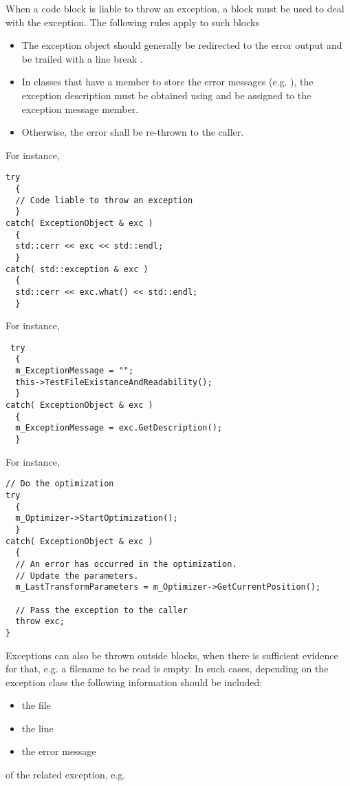 When a code block is liable to throw an exception, a  block must
be used to deal with the exception. The following rules apply to such blocks
\begin{itemize}
\item The exception object should generally be redirected to the error output
 and be trailed with a line break .
\item In classes that have a member to store the error messages (e.g.
), the exception description must be obtained using
 and be assigned to the exception message member.
\item Otherwise, the error shall be re-thrown to the caller.
\end{itemize}

For instance,

\small
\begin{verbatim}
try
  {
  // Code liable to throw an exception
  }
catch( ExceptionObject & exc )
  {
  std::cerr << exc << std::endl;
  }
catch( std::exception & exc )
  {
  std::cerr << exc.what() << std::endl;
  }
\end{verbatim}
\normalsize

For instance,

\small
\begin{verbatim}
 try
  {
  m_ExceptionMessage = "";
  this->TestFileExistanceAndReadability();
  }
catch( ExceptionObject & exc )
  {
  m_ExceptionMessage = exc.GetDescription();
  }
\end{verbatim}
\normalsize

For instance,

\small
\begin{verbatim}
// Do the optimization
try
  {
  m_Optimizer->StartOptimization();
  }
catch( ExceptionObject & exc )
  {
  // An error has occurred in the optimization.
  // Update the parameters.
  m_LastTransformParameters = m_Optimizer->GetCurrentPosition();

  // Pass the exception to the caller
  throw exc;
}
\end{verbatim}
\normalsize

Exceptions can also be thrown outside  blocks, when there is
sufficient evidence for that, e.g. a filename to be read is empty. In such
cases, depending on the exception class the following information should be
included:
\begin{itemize}
\item the file
\item the line
\item the error message
\end{itemize}
of the related exception, e.g.

